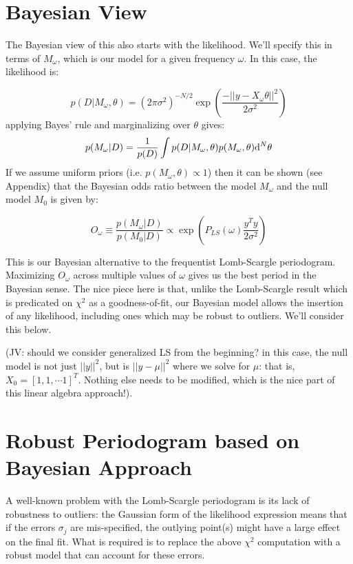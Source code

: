 \documentclass[12pt,pdftex]{article}
\begin{document}
\section{Bayesian View}
The Bayesian view of this also starts with the likelihood.
We'll specify this in terms of $M_\omega$, which is our model for a given frequency $\omega$. In this case, the likelihood is:

\begin{equation}
  p(D|M_\omega,\theta) =
  (2\pi\sigma^2)^{-N/2} \exp\left(
  \frac{-||y - X_\omega\theta||^2}{2\sigma^2}
  \right)
\end{equation}
applying Bayes' rule and marginalizing over $\theta$ gives:
\begin{equation}
  p(M_\omega|D) = \frac{1}{p(D)}\int p(D|M_\omega,\theta)p(M_\omega, \theta){\rm d}^N\theta
\end{equation}
If we assume uniform priors (i.e. $p(M_\omega, \theta) \propto 1$) then it can be shown (see Appendix) that the Bayesian odds ratio between the model $M_\omega$ and the null model $M_0$ is given by:

\begin{equation}
  O_\omega \equiv \frac{p(M_\omega|D)}{p(M_0|D)} \propto \exp\left(P_{LS}(\omega)\frac{y^Ty}{2\sigma^2}\right)
\end{equation}

This is our Bayesian alternative to the frequentist Lomb-Scargle periodogram.
Maximizing $O_\omega$ across multiple values of $\omega$ gives us the best period in the Bayesian sense.
The nice piece here is that, unlike the Lomb-Scargle result which is predicated on $\chi^2$ as a goodness-of-fit, our Bayesian model allows the insertion of any likelihood, including ones which may be robust to outliers. We'll consider this below.

(JV: should we consider generalized LS from the beginning? in this case, the null model is not just $||y||^2$, but is $||y - \mu||^2$ where we solve for $\mu$: that is, $X_0 = [1, 1, \cdots 1]^T$. Nothing else needs to be modified, which is the nice part of this linear algebra approach!).

\section{Robust Periodogram based on Bayesian Approach}

A well-known problem with the Lomb-Scargle periodogram is its lack of robustness to outliers: the Gaussian form of the likelihood expression means that if the errors $\sigma_j$ are mis-specified, the outlying point(s) might have a large effect on the final fit. 
What is required is to replace the above $\chi^2$ computation with a robust model that can account for these errors.
\end{document}
